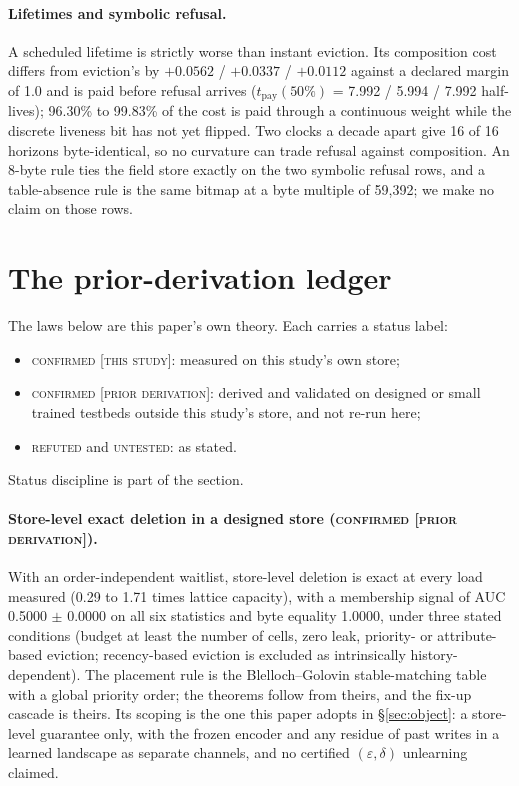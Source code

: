 \documentclass{article} %
\begin{document}
\paragraph{Lifetimes and symbolic refusal.} A scheduled lifetime is strictly worse than instant
eviction. Its composition cost differs from eviction's by $+0.0562$ / $+0.0337$ / $+0.0112$ against a
declared margin of 1.0 and is paid before refusal arrives ($t_{\text{pay}}(50\%)$ = 7.992 / 5.994 /
7.992 half-lives); 96.30\% to 99.83\% of the cost is paid through a continuous weight while the
discrete liveness bit has not yet flipped. %
Two clocks a decade apart give 16 of 16 horizons byte-identical, so no curvature can trade refusal
against composition. An 8-byte rule ties the field store exactly on the two symbolic refusal rows,
and a table-absence rule is the same bitmap at a byte multiple of 59,392; we make no claim on those
rows. %

\section{The prior-derivation ledger}
\label{app:shorts}

The laws below are this paper's own theory. Each carries a status label:
\begin{itemize}[leftmargin=*,nosep]
\item \textsc{confirmed [this study]}: measured on this study's own store;
\item \textsc{confirmed [prior derivation]}: derived and validated on designed or small trained
  testbeds outside this study's store, and not re-run here;
\item \textsc{refuted} and \textsc{untested}: as stated.
\end{itemize}
Status discipline is part of the section.


\paragraph{Store-level exact deletion in a designed store (\textsc{confirmed [prior
derivation]}).} With an order-independent waitlist, store-level deletion is exact at every load
measured (0.29 to 1.71 times lattice capacity), with a membership signal of AUC 0.5000 $\pm$ 0.0000 on all
six statistics and byte equality 1.0000, under three stated conditions (budget at least the number
of cells, zero leak, priority- or attribute-based eviction; recency-based eviction is excluded as
intrinsically history-dependent). %
The placement rule is the Blelloch--Golovin stable-matching table with a global priority order;
the theorems follow from theirs, and the fix-up cascade is theirs. Its scoping is the one this
paper adopts in \S\ref{sec:object}: a store-level guarantee only, with the frozen encoder and any
residue of past writes in a learned landscape as separate channels, and no certified
$(\varepsilon,\delta)$ unlearning claimed. %
\end{document}
